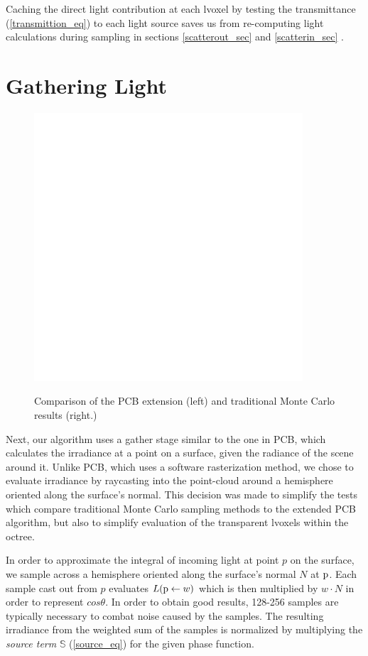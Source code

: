 \documentclass[12pt]{ucthesis}
\newcommand{\captionfonts}{\small\bf\ssp}
\begin{document}
Caching the direct light contribution at each lvoxel by testing the transmittance (\ref{transmittion_eq}) to each light source saves us from re-computing light calculations during sampling in sections \ref{scatterout_sec} and \ref{scatterin_sec} \cite{signotes:2010}.


\section{Gathering Light}

\begin{figure}[h!]
    \centering
    \includegraphics[width=100mm]{img/diag/orthnormal.pdf}
    \captionfonts
    \caption{Comparison of the PCB extension (left) and traditional Monte Carlo results (right.)}
    \label{fig:orthonormal}
\end{figure}

Next, our algorithm uses a gather stage similar to the one in PCB, which calculates the irradiance at a point on a surface, given the radiance of the scene around it.  Unlike PCB, which uses a software rasterization method, we chose to evaluate irradiance by raycasting into the point-cloud around a hemisphere oriented along the surface's normal.  This decision was made to simplify the tests which compare traditional Monte Carlo sampling methods to the extended PCB algorithm, but also to simplify evaluation of the transparent lvoxels within the octree.

In order to approximate the integral of incoming light at point $p$ on the surface, we sample across a hemisphere oriented along the surface's normal $N$ at $\textup{p}$.  Each sample cast out from $p$ evaluates $L(\textup{p} \leftarrow w)$ which is then multiplied by $w \cdot N$ in order to represent $cos\theta$.  In order to obtain good results, 128-256 samples are typically necessary to combat noise caused by the samples.  The resulting irradiance from the weighted sum of the samples is normalized by multiplying the \textit{source term} $\mathbb{S}$ (\ref{source_eq}) for the given phase function. 
\end{document}
